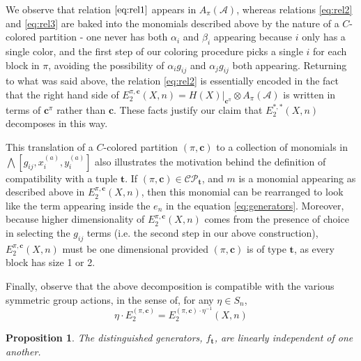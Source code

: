 \documentclass[11pt,reqno]{amsproc}
\numberwithin{equation}{section}
\newtheorem{proposition}[theorem]{Proposition}
\theoremstyle{definition}
\theoremstyle{remark}
\newcommand{\spp}[1]{^{(#1)}}
\begin{document}
We observe that relation $\eqref{eq:rel1}$ appears in $A_\pi(\mathcal{A})$, whereas relations \eqref{eq:rel2} and \eqref{eq:rel3} are baked into the monomials described above by the nature of a $C$-colored partition - one never has both $\alpha_i$ and $\beta_i$ appearing because $i$ only has a single color, and the first step of our coloring procedure picks a single $i$ for each block in $\pi$, avoiding the possibility of $\alpha_ig_{ij}$ and $\alpha_jg_{ij}$ both appearing. Returning to what was said above, the relation \eqref{eq:rel2} is essentially encoded in the fact that the right hand side of $E_2^{\pi,\mathbf{c}}(X,n)= H(X)|_{\mathbf{c}^\pi} \otimes A_\pi(\mathcal{A})$ is written in terms of $\mathbf{c}^\pi$ rather than $\mathbf{c}$. These facts justify our claim that $E_2^{*,*}(X,n)$ decomposes in this way.

This translation of a $C$-colored partition $(\pi,\mathbf{c})$ to a collection of monomials in $\bigwedge[g_{ij}, x\spp{a}_i, y\spp{a}_i]$ also illustrates the motivation behind the definition of compatibility with a tuple $\mathbf{t}$. If $(\pi,\mathbf{c}) \in \mathcal{CP}_\mathbf{t}$, and $m$ is a monomial appearing as described above in $E_2^{\pi,\mathbf{c}}(X,n)$, then this monomial can be rearranged to look like the term appearing inside the $e_n$ in the equation \eqref{eq:generators}. Moreover, because higher dimensionality of $E_2^{\pi,\mathbf{c}}(X,n)$ comes from the presence of choice in selecting the $g_{ij}$ terms (i.e. the second step in our above construction), $E_2^{\pi,\mathbf{c}}(X,n)$ must be one dimensional provided $(\pi,\mathbf{c})$ is of type $\mathbf{t}$, as every block has size 1 or 2.

Finally, observe that the above decomposition is compatible with the various symmetric group actions, in the sense of, for any $\eta \in S_n$,
\[
\eta \cdot E_2^{(\pi,\mathbf{c})} = E_2^{(\pi,\mathbf{c})\cdot \eta^{-1}}(X,n)
\]

\begin{proposition}
    The distinguished generators, $f_{\mathbf{t}}$, are linearly independent of one another.
\end{proposition}
\end{document}
